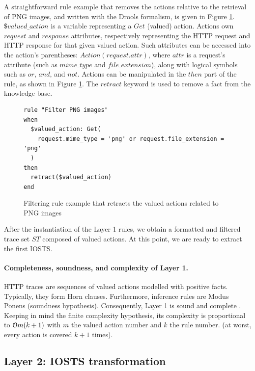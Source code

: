 A straightforward rule example that removes the actions relative
to the retrieval of PNG images, and written with the Drools
formalism, is given in Figure \ref{fig:layer1:filter}.
$\$valued\_action$ is a variable representing a $Get$ (valued)
action.  Actions own $request$ and $response$ attributes,
respectively representing the HTTP request and HTTP response for
that given valued action. Such attributes can be accessed into
the action's parentheses: $Action(request.attr)$, where $attr$ is
a request's attribute (such as $mime\_type$ and
$file\_extension$), along with logical symbols such as $or$,
$and$, and $not$. Actions can be manipulated in the $then$ part
of the rule, as shown in Figure \ref{fig:layer1:filter}. The
$retract$ keyword is used to remove a fact from the knowledge
base.

\begin{figure}[ht]
\begin{framed}
\begin{BVerbatim}
rule "Filter PNG images"
when
  $valued_action: Get(
    request.mime_type = 'png' or request.file_extension = 'png'
  )
then
  retract($valued_action)
end
\end{BVerbatim}
\end{framed}

\caption{Filtering rule example that retracts the valued actions
related to PNG images}
\label{fig:layer1:filter}
\end{figure}

After the instantiation of the Layer 1 rules, we obtain a
formatted and filtered trace set $ST$ composed of valued actions.
At this point, we are ready to extract the first IOSTS.

\paragraph{Completeness, soundness, and complexity of Layer 1.}

HTTP traces are sequences of valued actions modelled with
positive facts. Typically, they form Horn clauses. Furthermore,
inference rules are Modus Ponens (soundness hypothesis).
Consequently, Layer 1 is sound and complete \cite{logicreasoning}.
Keeping in mind the finite complexity hypothesis, its complexity
is proportional to $\EuScript{O}m(k+1)$ with $m$ the valued
action number and $k$ the rule number. (at worst, every action is
covered $k+1$ times).

\subsection{Layer 2: IOSTS transformation}
\label{sec:modelinf:webapps:L2}


